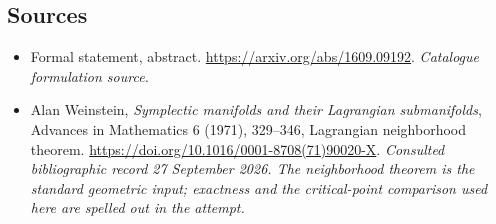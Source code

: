 \documentclass[11pt,a4paper]{article}
\numberwithin{equation}{section}
\begin{document}
\subsection{Sources}
\begin{itemize}\raggedright
\item[\textnormal{[S1]}]\hypertarget{source:178:1}{} Formal statement, abstract.
\url{https://arxiv.org/abs/1609.09192}.
{\small\textit{Catalogue formulation source.}}
\item[\textnormal{[E1]}]\hypertarget{extra:178:1}{} Alan Weinstein,
\emph{Symplectic manifolds and their Lagrangian submanifolds},
Advances in Mathematics 6 (1971), 329--346, Lagrangian neighborhood theorem.
\url{https://doi.org/10.1016/0001-8708(71)90020-X}.
{\small\textit{Consulted bibliographic record 27 September 2026. The
neighborhood theorem is the standard geometric input; exactness and the
critical-point comparison used here are spelled out in the attempt.}}
\end{itemize}
\end{document}

